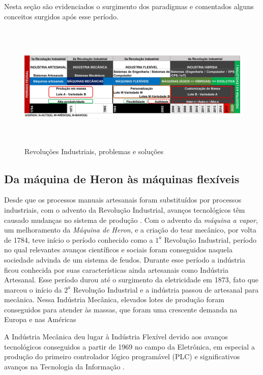 Nesta seção são evidenciados o surgimento dos paradigmas e comentados alguns conceitos surgidos após esse período.

\begin{figure}
	\centering
	\includegraphics[width=16cm, height=6cm]{img/F9_MeDSE_RI_FULL3.jpg} 
	\caption{Revoluções Industriais, problemas e soluções}
	\label{F9}
\end{figure}

\subsection{Da máquina de Heron às máquinas flexíveis}	

Desde que os processos manuais artesanais foram substituídos por processos industriais, com o advento da Revolução Industrial, avanços tecnológicos têm causado mudanças no sistema de produção \cite{NAHER2008}. Com o advento da \textit{máquina a vapor}, um melhoramento da \textit{Máquina de Heron}, e a criação do tear mecânico, por volta de 1784, teve início o período conhecido como a $1^a$ Revolução Industrial, período no qual relevantes avanços científicos e sociais foram conseguidos naquela sociedade advinda de um sistema de feudos. Durante esse período a indústria ficou conhecida por suas características ainda artesanais como Indústria Artesanal. Esse período durou até o surgimento da eletricidade em 1873, fato que marcou o início da $2^a$ Revolução Industrial e a indústria passou de artesanal para mecânica. Nessa Indústria Mecânica, elevados lotes de produção foram conseguidos para atender às massas, que foram uma crescente demanda na Europa e nas Américas \cite{DRATH2014}

A Indústria Mecânica deu lugar à Indústria Flexível devido aos avanços tecnológicos conseguidos a partir de 1969 no campo da Eletrônica, em especial a  produção do primeiro controlador lógico programável (PLC) e significativos avanços na Tecnologia da Informação \cite{NAHER2008}.



